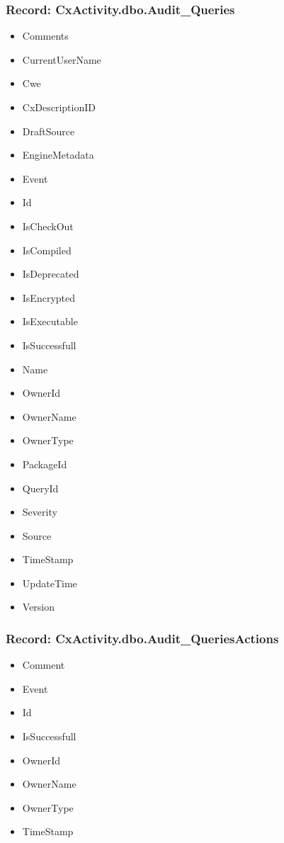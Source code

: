 \subsubsection{Record: CxActivity.dbo.Audit\_Queries}
\begin{itemize}
    \item Comments
    \item CurrentUserName
    \item Cwe
    \item CxDescriptionID
    \item DraftSource
    \item EngineMetadata
    \item Event
    \item Id
    \item IsCheckOut
    \item IsCompiled
    \item IsDeprecated
    \item IsEncrypted
    \item IsExecutable
    \item IsSuccessfull
    \item Name
    \item OwnerId
    \item OwnerName
    \item OwnerType
    \item PackageId
    \item QueryId
    \item Severity
    \item Source
    \item TimeStamp
    \item UpdateTime
    \item Version
\end{itemize}

\subsubsection{Record: CxActivity.dbo.Audit\_QueriesActions}
\begin{itemize}
    \item Comment
    \item Event
    \item Id
    \item IsSuccessfull
    \item OwnerId
    \item OwnerName
    \item OwnerType
    \item TimeStamp
\end{itemize}


